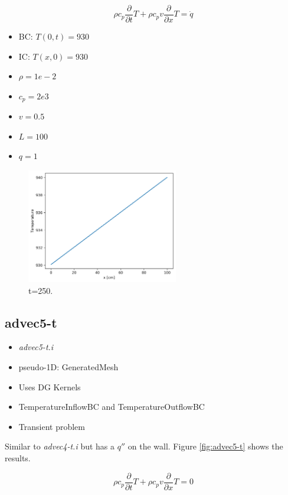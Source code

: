 \documentclass[11pt,letterpaper]{article}
\begin{document}
	\begin{equation}
    \rho c_p \frac{\partial}{\partial t}T + \rho c_p v \frac{\partial}{\partial x} T = \dot{q}
	\end{equation}

	\begin{itemize}
		\item BC: $T(0, t) = 930$
		\item IC: $T(x, 0) = 930$
		\item $\rho = 1e-2$
		\item $c_p = 2e3$
		\item $v = 0.5$
		\item $L = 100$
		\item $q = 1$
	\end{itemize}

	\begin{figure}[htbp!]
		\centering
		\includegraphics[height=5cm]{advec4-t-251}
		\caption{t=250.}
		\label{fig:advec4-t}
	\end{figure}

	\subsection{advec5-t}

	\begin{itemize}
		\item \textit{advec5-t.i}
		\item pseudo-1D: GeneratedMesh
		\item Uses DG Kernels
		\item TemperatureInflowBC and TemperatureOutflowBC
		\item Transient problem
	\end{itemize}

    Similar to \textit{advec4-t.i} but has a $q''$ on the wall.
    Figure \ref{fig:advec5-t} shows the results.

	\begin{equation}
    \rho c_p \frac{\partial}{\partial t}T + \rho c_p v \frac{\partial}{\partial x} T = 0
	\end{equation}
\end{document}
